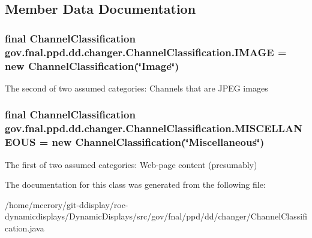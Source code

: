 \subsection{Member Data Documentation}
\hypertarget{classgov_1_1fnal_1_1ppd_1_1dd_1_1changer_1_1ChannelClassification_a368a93f6624e94cdd2a80b67e37d6187}{
\subsubsection[{I\-M\-A\-G\-E}]{\setlength{\rightskip}{0pt plus 5cm}final {\bf Channel\-Classification} gov.\-fnal.\-ppd.\-dd.\-changer.\-Channel\-Classification.\-I\-M\-A\-G\-E = new {\bf Channel\-Classification}(\char`\"{}Image\char`\"{})\hspace{0.3cm}{\ttfamily [static]}}}\label{classgov_1_1fnal_1_1ppd_1_1dd_1_1changer_1_1ChannelClassification_a368a93f6624e94cdd2a80b67e37d6187}
The second of two assumed categories\-: Channels that are J\-P\-E\-G images \hypertarget{classgov_1_1fnal_1_1ppd_1_1dd_1_1changer_1_1ChannelClassification_aff2ea773d09e0647abdcb5642bbbec0b}{
\subsubsection[{M\-I\-S\-C\-E\-L\-L\-A\-N\-E\-O\-U\-S}]{\setlength{\rightskip}{0pt plus 5cm}final {\bf Channel\-Classification} gov.\-fnal.\-ppd.\-dd.\-changer.\-Channel\-Classification.\-M\-I\-S\-C\-E\-L\-L\-A\-N\-E\-O\-U\-S = new {\bf Channel\-Classification}(\char`\"{}Miscellaneous\char`\"{})\hspace{0.3cm}{\ttfamily [static]}}}\label{classgov_1_1fnal_1_1ppd_1_1dd_1_1changer_1_1ChannelClassification_aff2ea773d09e0647abdcb5642bbbec0b}
The first of two assumed categories\-: Web-\/page content (presumably) 

The documentation for this class was generated from the following file\-:\begin{DoxyCompactItemize}
\item 
/home/mccrory/git-\/ddisplay/roc-\/dynamicdisplays/\-Dynamic\-Displays/src/gov/fnal/ppd/dd/changer/Channel\-Classification.\-java\end{DoxyCompactItemize}

